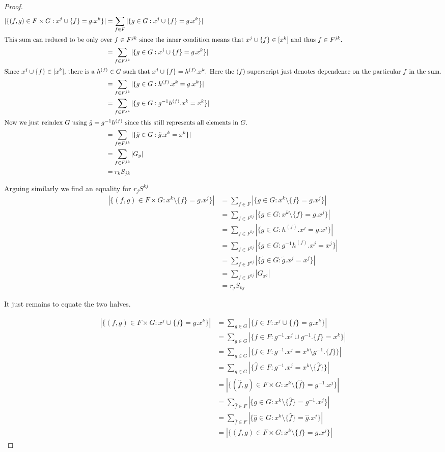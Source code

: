 \begin{proof}
\begin{align}
|\{(f,g) \in F \times G : x^j \cup \{f\} = g.x^k\}| &= \sum_{f \in F} |\{g \in G : x^j \cup \{f\} = g.x^k \}| \\
\intertext{This sum can reduced to be only over $f \in F^{jk}$ since the inner condition means that $x^j \cup \{f\} \in [x^k]$ and thus $f \in F^{jk}$.}
&= \sum_{f \in F^{jk}} |\{g \in G : x^j \cup \{f\} = g.x^k \}| \\
\intertext{Since  $x^j \cup \{f\} \in [x^k]$, there is a $h^{(f)} \in G$ such that $x^j \cup \{f\} = h^{(f)}.x^k$. Here the $(f)$ superscript just denotes dependence on the particular $f$ in the sum.}
&= \sum_{f \in F^{jk}} |\{g \in G : h^{(f)}.x^k = g.x^k \}| \\
&= \sum_{f \in F^{jk}} |\{g \in G : g^{-1}h^{(f)}.x^k = x^k \}| \\
\intertext{Now we just reindex $G$ using $\tilde{g} = g^{-1}h^{(f)}$ since this still represents all elements in $G$.}
&= \sum_{f \in F^{jk}} |\{\tilde{g} \in G : \tilde{g}.x^k = x^k \}| \\
&= \sum_{f \in F^{jk}} |G_y| \\
&= r_kS_{jk}
\end{align}

Arguing similarly we find an equality for $r_jS^{kj}$ 
\begin{align}
|\{(f,g) \in F \times G : x^k \setminus \{f\} = g.x^j\}| &= \sum_{f \in F} |\{g \in G : x^k \setminus \{f\} = g.x^j \}| \\
&= \sum_{f \in F^{kj}} |\{g \in G : x^k \setminus \{f\} = g.x^j \}| \\
&= \sum_{f \in F^{kj}} |\{g \in G : h^{(f)}.x^j = g.x^j \}| \\
&= \sum_{f \in F^{kj}} |\{g \in G : g^{-1}h^{(f)}.x^j = x^j \}| \\
&= \sum_{f \in F^{kj}} |\{\tilde{g} \in G : \tilde{g}.x^j = x^j \}| \\
&= \sum_{f \in F^{kj}} |G_{x^j}| \\
&= r_jS_{kj}
\end{align}

It just remains to equate the two halves.

\begin{align}
|\{(f,g) \in F \times G : x^j \cup \{f\} = g.x^k\}| &= \sum_{g \in G} |\{f \in F : x^j \cup \{f\} = g.x^k \}| \\
&= \sum_{g \in G} |\{f \in F : g^{-1}.x^j \cup g^{-1}.\{f\} = x^k \}| \\
&= \sum_{g \in G} |\{f \in F : g^{-1}.x^j  = x^k \setminus g^{-1}.\{f\} \}| \\
&= \sum_{g \in G} |\{\hat{f} \in F : g^{-1}.x^j  = x^k \setminus \{\hat{f}\} \}| \\
&= |\{(\hat{f},g) \in F \times G : x^k \setminus \{\hat{f}\} = g^{-1}.x^j\}| \\
&= \sum_{\hat{f} \in F}|\{g \in G : x^k \setminus \{\hat{f}\} = g^{-1}.x^j\}| \\
&= \sum_{\hat{f} \in F}|\{\hat{g} \in G : x^k \setminus \{\hat{f}\} = \hat{g}.x^j\}| \\
&= |\{(f,g) \in F \times G : x^k \setminus \{f\} = g.x^j\}|
\end{align}



\end{proof}

